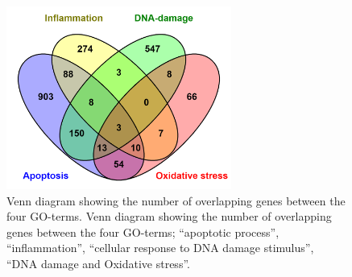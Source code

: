 \documentclass[ijms,article,submit,moreauthors,pdftex]{Definitions/mdpi}
\begin{document}




\newpage
\appendixstart
\appendix
\section{}

\setcounter{table}{0}
\renewcommand{\thetable}{A\arabic{table}}

\begin{figure}[h!]
\includegraphics[height=6cm,keepaspectratio]{figA1.png}
\caption{Venn diagram showing the number of overlapping genes between the four GO-terms.
Venn diagram showing the number of overlapping genes between the four GO-terms; “apoptotic process”, “inflammation”, “cellular response to DNA damage stimulus”, “DNA damage and Oxidative stress”.
}
\label{fig:figA1}
\end{figure}
\end{document}
